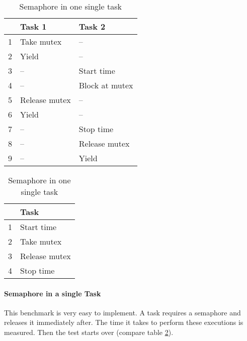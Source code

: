 \begin{table}[htbp]
\begin{minipage}[t]{0.45\textwidth}
	\begin{center}
		\begin{tabular}{|l|l|l|}
			\hline
				& Task 1							& Task 2						\\
				\hline 
			  1 & Take mutex					& --								\\
			  2 & Yield								& --								\\
			  3 & --									& Start time				\\ 
			  4 & --									& Block at mutex		\\
			  5 & Release mutex				& --								\\
			  6 & Yield								& --								\\
			  7 & --									& Stop time					\\ 
			  8 & --									& Release mutex			\\
			  9 & --									& Yield							\\			  
			\hline
		\end{tabular}
	\caption{Semaphore Shuffling Time proposed by Kar}
	\label{tab_sem_kar}
	\end{center}
	\end{minipage} \hfill 
	\begin{minipage}[t]{0.45\textwidth}
	\begin{center}
		\begin{tabular}{|l|l|}
			\hline
				& Task 							\\
				\hline 
				1 & Start time				\\ 
			  2 & Take mutex				\\
				3 & Release mutex			\\						 
			  4 & Stop time					\\ 			  
			\hline
		\end{tabular}
	\caption{Semaphore in one single task}
	\label{tab_sem_single}
	\end{center}
	\end{minipage}
\end{table}

\paragraph{Semaphore in a single Task}
This benchmark is very easy to implement.
A task requires a semaphore and releases it immediately after.
The time it takes to perform these executions is measured.
Then the test starts over (compare table \ref{tab_sem_single}).

